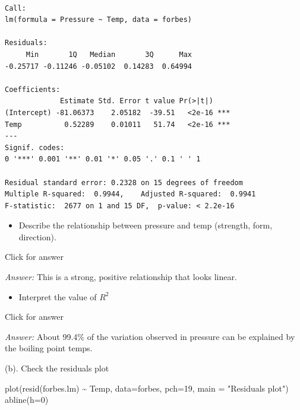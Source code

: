 \documentclass[
]{book}
\newenvironment{Shaded}{\begin{snugshade}}{\end{snugshade}}
\newcommand{\AttributeTok}[1]{\textcolor[rgb]{0.77,0.63,0.00}{#1}}
\newcommand{\DecValTok}[1]{\textcolor[rgb]{0.00,0.00,0.81}{#1}}
\newcommand{\FunctionTok}[1]{\textcolor[rgb]{0.00,0.00,0.00}{#1}}
\newcommand{\NormalTok}[1]{#1}
\newcommand{\SpecialCharTok}[1]{\textcolor[rgb]{0.00,0.00,0.00}{#1}}
\newcommand{\StringTok}[1]{\textcolor[rgb]{0.31,0.60,0.02}{#1}}
\providecommand{\tightlist}{%
  \setlength{\itemsep}{0pt}\setlength{\parskip}{0pt}}
\begin{document}
\begin{verbatim}

Call:
lm(formula = Pressure ~ Temp, data = forbes)

Residuals:
     Min       1Q   Median       3Q      Max 
-0.25717 -0.11246 -0.05102  0.14283  0.64994 

Coefficients:
             Estimate Std. Error t value Pr(>|t|)    
(Intercept) -81.06373    2.05182  -39.51   <2e-16 ***
Temp          0.52289    0.01011   51.74   <2e-16 ***
---
Signif. codes:  
0 '***' 0.001 '**' 0.01 '*' 0.05 '.' 0.1 ' ' 1

Residual standard error: 0.2328 on 15 degrees of freedom
Multiple R-squared:  0.9944,    Adjusted R-squared:  0.9941 
F-statistic:  2677 on 1 and 15 DF,  p-value: < 2.2e-16
\end{verbatim}

\begin{itemize}
\tightlist
\item
  Describe the relationship between pressure and temp (strength, form, direction).
\end{itemize}

Click for answer

\emph{Answer:} This is a strong, positive relationship that looks linear.

\begin{itemize}
\tightlist
\item
  Interpret the value of \(R^2\)
\end{itemize}

Click for answer

\emph{Answer:} About 99.4\% of the variation observed in pressure can be explained by the boiling point temps.

(b). Check the residuals plot

\begin{Shaded}
\begin{Highlighting}[]
\FunctionTok{plot}\NormalTok{(}\FunctionTok{resid}\NormalTok{(forbes.lm) }\SpecialCharTok{\textasciitilde{}}\NormalTok{ Temp, }\AttributeTok{data=}\NormalTok{forbes, }\AttributeTok{pch=}\DecValTok{19}\NormalTok{, }\AttributeTok{main =} \StringTok{"Residuals plot"}\NormalTok{)}
\FunctionTok{abline}\NormalTok{(}\AttributeTok{h=}\DecValTok{0}\NormalTok{)}
\end{Highlighting}
\end{Shaded}
\end{document}
